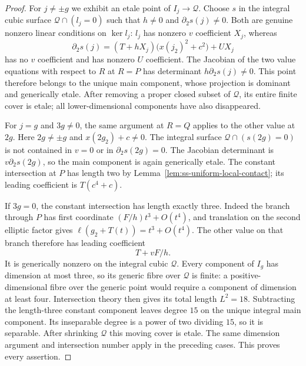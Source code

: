 \begin{proof}
For $j\ne\pm g$ we exhibit an etale point of $I_j\to\mathcal Q$.
Choose $s$ in the integral cubic surface $\mathcal Q\cap(l_j=0)$
such that $h\ne0$ and $\partial_2s(j)\ne0$.
Both are genuine nonzero linear conditions on $\ker l_j$:
$l_j$ has nonzero $v$ coefficient $X_j$, whereas
\[
 \partial_2s(j)=(T+hX_j)\bigl(x(j_2)^2+c^2\bigr)+UX_j
\]
has no $v$ coefficient and has nonzero $U$ coefficient.
The Jacobian of the two value equations with respect to $R$ at
$R=P$ has determinant $h\partial_2s(j)\ne0$.
This point therefore belongs to the unique main component, whose
projection is dominant and generically etale. After removing a
proper closed subset of $\mathcal Q$, its entire finite cover is
etale; all lower-dimensional components have also disappeared.

For $j=g$ and $3g\ne0$, the same argument at $R=Q$ applies to
the other value at $2g$. Here $2g\ne\pm g$ and
$x(2g_2)+c\ne0$. The integral surface
$\mathcal Q\cap(s(2g)=0)$ is not contained in $v=0$ or in
$\partial_2s(2g)=0$. The Jacobian determinant is
$v\partial_2s(2g)$, so the main component is again generically
etale. The constant intersection at $P$ has length two by
Lemma~\ref{lem:ss-uniform-local-contact}; its leading coefficient
is $T(c^4+c)$.

If $3g=0$, the constant intersection has length exactly three.
Indeed the branch through $P$ has first coordinate
$(F/h)t^3+O(t^4)$, and translation on the second elliptic factor
gives $\ell(g_2+T(t))=t^3+O(t^4)$. The other value on that branch
therefore has leading coefficient
\begin{equation}\label{eq:ss-flex-contact-length}
                             T+vF/h.
\end{equation}
It is generically nonzero on the integral cubic $\mathcal Q$.
Every component of $I_g$ has dimension at most three, so its
generic fibre over $\mathcal Q$ is finite: a positive-dimensional
fibre over the generic point would require a component of dimension
at least four. Intersection theory then gives its total length
$L^2=18$. Subtracting the length-three constant component leaves
degree $15$ on the unique integral main component. Its inseparable
degree is a power of two dividing $15$, so it is separable.
After shrinking $\mathcal Q$ this moving cover is etale.
The same dimension argument and intersection number apply in the
preceding cases. This proves every assertion.
\end{proof}

